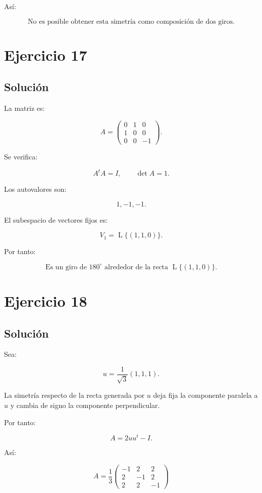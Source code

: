 \documentclass[11pt,a4paper]{article}
\newcommand{\Span}{\operatorname{L}}
\begin{document}
Así:

\[
\boxed{
\text{No es posible obtener esta simetría como composición de dos giros.}
}
\]

\section{Ejercicio 17}
\subsection{Solución}

La matriz es:

\[
A=
\begin{pmatrix}
0&1&0\\
1&0&0\\
0&0&-1
\end{pmatrix}.
\]

Se verifica:

\[
A^tA=I,
\qquad
\det A=1.
\]

Los autovalores son:

\[
1,-1,-1.
\]

El subespacio de vectores fijos es:

\[
V_1
=
\Span\{(1,1,0)\}.
\]

Por tanto:

\[
\boxed{
\text{Es un giro de }180^\circ
\text{ alrededor de la recta }
\Span\{(1,1,0)\}.
}
\]

\section{Ejercicio 18}
\subsection{Solución}

Sea:

\[
u=
\frac1{\sqrt3}(1,1,1).
\]

La simetría respecto de la recta generada por \(u\) deja fija la componente paralela a \(u\) y cambia de signo la componente perpendicular.

Por tanto:

\[
A
=
2uu^t-I.
\]

Así:

\[
\boxed{
A
=
\frac13
\begin{pmatrix}
-1&2&2\\
2&-1&2\\
2&2&-1
\end{pmatrix}
}
\]
\end{document}
